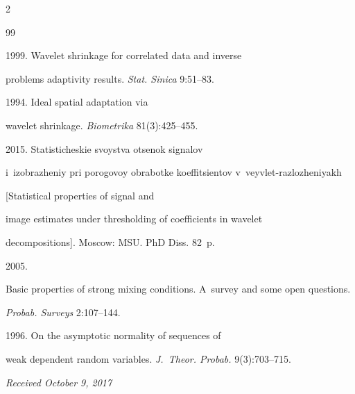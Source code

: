 \begin{multicols}{2}
{{\begin{thebibliography}{99}

 1999. Wavelet shrinkage for correlated data and inverse 

problems adaptivity results.  \textit{Stat. Sinica} 9:51--83.








 1994. Ideal spatial adaptation via 

wavelet shrinkage. \textit{Biometrika} 81(3):425--455.




 2015. Statisticheskie svoystva otsenok signalov 

i~izobrazheniy pri porogovoy obrabotke ko\-ef\-fi\-tsi\-en\-tov v~veyvlet-razlozheniyakh

[Statistical properties of signal and 

image estimates under thresholding of coefficients in wavelet 

decompositions].   Moscow: MSU. PhD Diss. 82~p. 




 2005. 

Basic properties of strong mixing conditions. A~survey and some open questions. 

\textit{Probab. Surveys}  2:107--144.




 1996. On the asymptotic normality of sequences of 

weak dependent random variables. \textit{J.~Theor. Probab.} 9(3):703--715.

\end{thebibliography}



 }

 }



\end{multicols}



\vspace*{-3pt}



\hfill{\small\textit{Received October 9, 2017}}



